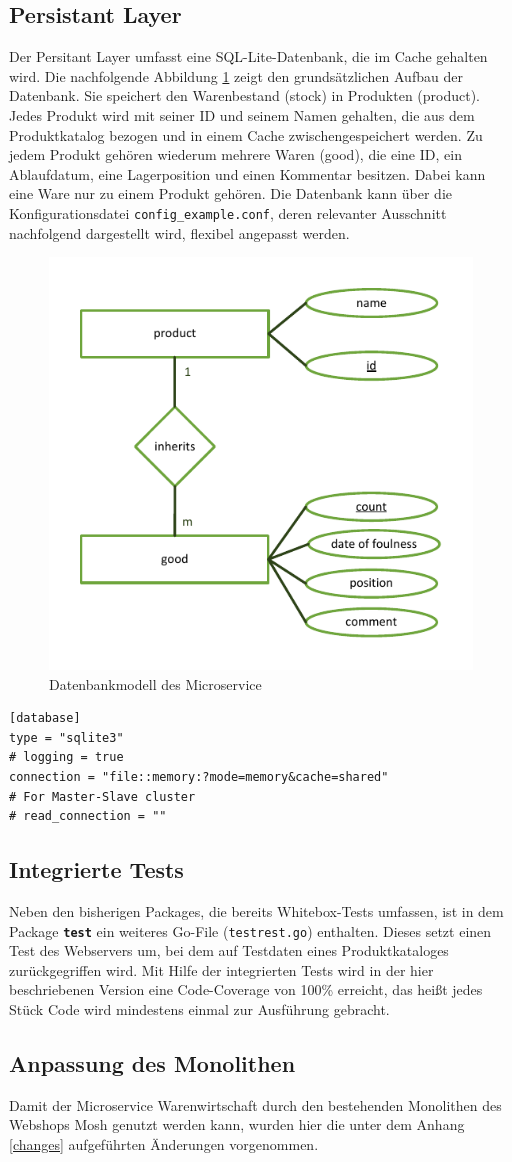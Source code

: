 \subsection{Persistant Layer}
Der Persitant Layer umfasst eine SQL-Lite-Datenbank, die im Cache gehalten wird. Die nachfolgende Abbildung \ref{pic:Datenbankmodell des Microservice} zeigt den grundsätzlichen Aufbau der Datenbank. Sie speichert den Warenbestand (stock) in Produkten (product). Jedes Produkt wird mit seiner ID und seinem Namen gehalten, die aus dem Produktkatalog bezogen und in einem Cache zwischengespeichert werden. Zu jedem Produkt gehören wiederum mehrere Waren (good), die eine ID, ein Ablaufdatum, eine Lagerposition und einen Kommentar besitzen. Dabei kann eine Ware nur zu einem Produkt gehören. Die Datenbank kann über die Konfigurationsdatei \texttt{config\_example.conf}, deren relevanter Ausschnitt nachfolgend dargestellt wird, flexibel angepasst werden.

\begin{figure}[H]
	\centering
	\includegraphics[width=0.40 \textwidth]{./pics/db.pdf}
	\caption{Datenbankmodell des Microservice}
	\label{pic:Datenbankmodell des Microservice}
\end{figure}


\begin{lstlisting}[caption=Datenbankeinstellungen in der Konfigurationsdatei]
[database]
type = "sqlite3"
# logging = true
connection = "file::memory:?mode=memory&cache=shared"
# For Master-Slave cluster
# read_connection = ""
\end{lstlisting}

\newpage
\subsection{Integrierte Tests}
\label{subsec: Integrierte Test}
Neben den bisherigen Packages, die bereits Whitebox-Tests umfassen, ist in dem Package \textbf{\texttt{test}} ein weiteres Go-File (\texttt{testrest.go}) enthalten. Dieses setzt einen Test des Webservers um, bei dem auf Testdaten eines Produktkataloges zurückgegriffen wird. Mit Hilfe der integrierten Tests wird in der hier beschriebenen Version eine Code-Coverage von 100\% erreicht, das heißt jedes Stück Code wird mindestens einmal zur Ausführung gebracht.

\subsection{Anpassung des Monolithen}
\label{subsec: Anpassung des Monolithen}
Damit der Microservice Warenwirtschaft durch den bestehenden Monolithen des Webshops Mosh genutzt werden kann, wurden hier die unter dem Anhang \ref{changes} aufgeführten Änderungen vorgenommen. 
